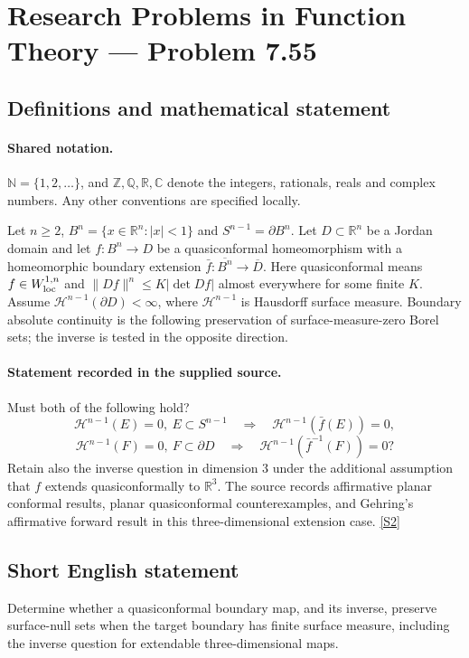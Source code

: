 \documentclass[11pt]{article}
\newcommand{\sref}[2]{\hyperlink{source:#1:#2}{[S#2]}}
\begin{document}
\section{Research Problems in Function Theory — Problem 7.55}\label{statement}

\subsection{Definitions and mathematical statement}

\paragraph{Shared notation.}$\mathbb N=\{1,2,\ldots\}$, and $\mathbb Z,\mathbb Q,\mathbb R,\mathbb C$ denote the integers, rationals, reals and complex numbers. Any other conventions are specified locally.


Let $n\ge2$, $B^n=\{x\in\mathbb R^n:|x|<1\}$ and $S^{n-1}=\partial B^n$. Let $D\subset\mathbb R^n$ be a Jordan domain and let $f:B^n\to D$ be a quasiconformal homeomorphism with a homeomorphic boundary extension $\bar f:\overline{B^n}\to\overline D$. Here quasiconformal means $f\in W^{1,n}_{\rm loc}$ and $\|Df\|^n\le K|\det Df|$ almost everywhere for some finite $K$. Assume $\mathcal H^{n-1}(\partial D)<\infty$, where $\mathcal H^{n-1}$ is Hausdorff surface measure. Boundary absolute continuity is the following preservation of surface-measure-zero Borel sets; the inverse is tested in the opposite direction.
\paragraph{Statement recorded in the supplied source.}
Must both of the following hold?
\[\mathcal H^{n-1}(E)=0,\ E\subset S^{n-1}\quad\Longrightarrow\quad\mathcal H^{n-1}(\bar f(E))=0,
\]
\[\mathcal H^{n-1}(F)=0,\ F\subset\partial D\quad\Longrightarrow\quad\mathcal H^{n-1}(\bar f^{-1}(F))=0?
\]
Retain also the inverse question in dimension $3$ under the additional assumption that $f$ extends quasiconformally to $\mathbb R^3$. The source records affirmative planar conformal results, planar quasiconformal counterexamples, and Gehring's affirmative forward result in this three-dimensional extension case. \sref{statement}{2}
\subsection{Short English statement}
Determine whether a quasiconformal boundary map, and its inverse, preserve surface-null sets when the target boundary has finite surface measure, including the inverse question for extendable three-dimensional maps.
\end{document}
